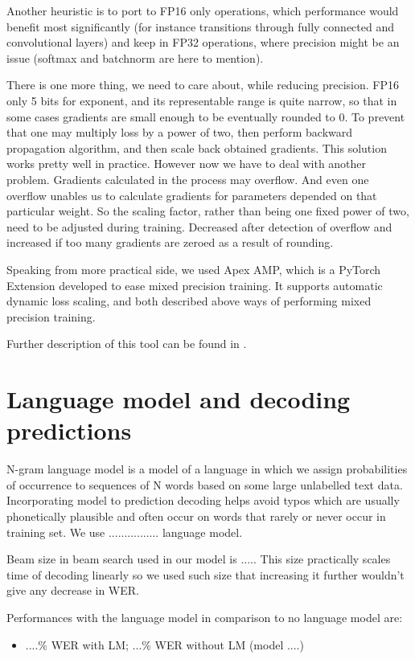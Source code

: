 \documentclass[licencjacka,en]{pracamgr}
\begin{document}
Another heuristic is to port to FP16 only operations, which performance would benefit most significantly (for instance transitions through fully connected and convolutional layers) and keep in FP32 operations, where precision might be an issue (softmax and batchnorm are here to mention). \cite{APEX}

There is one more thing, we need to care about, while reducing precision. FP16 only 5 bits for exponent, and its representable range is quite narrow, so that in some cases gradients are small enough to be eventually rounded to 0. To prevent that one may multiply loss by a power of two, then perform backward propagation algorithm, and then scale back obtained gradients. This solution works pretty well in practice. However now we have to deal with another problem. Gradients calculated in the process may overflow. And even one overflow unables us to calculate gradients for parameters depended on that particular weight. So the scaling factor, rather than being one fixed power of two, need to be adjusted during training. Decreased after detection of overflow and increased if too many gradients are zeroed as a result of rounding.\cite{LOSS_SCALING}

Speaking from more practical side, we used Apex AMP, which is a PyTorch Extension developed to ease mixed precision training. It supports automatic dynamic loss scaling, and both described above ways of performing mixed precision training.

Further description of this tool can be found in \cite{APEX_DOCS}.
\section{Language model and decoding predictions}
N-gram language model is a model of a language in which we assign probabilities of occurrence to sequences of N words based on some large unlabelled text data. Incorporating model to prediction decoding helps avoid typos which are usually phonetically plausible and often occur on words that rarely or never occur in training set. We use ................ language model.

Beam size in beam search used in our model is ..... This size practically scales time of decoding linearly so we used such size that increasing it further wouldn't give any decrease in WER.

Performances with the language model in comparison to no language model are:
\begin{itemize}
  \item ....\% WER with LM; ...\% WER without LM (model ....)
\end{itemize}
\end{document}
